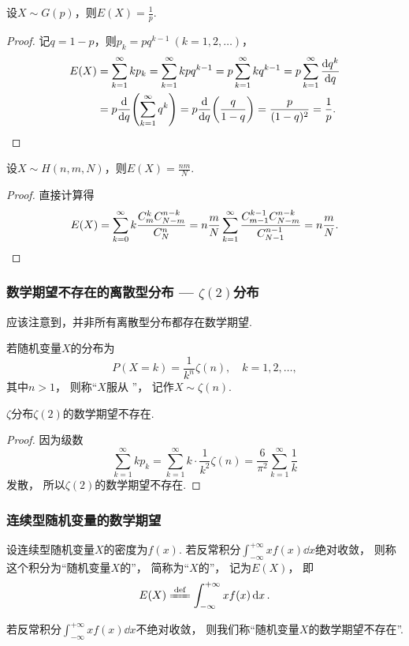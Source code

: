 \begin{proposition}\label{theorem:随机变量的数字特征.几何分布的数学期望}
设\(X \sim G(p)\)，则\(E(X) = \frac{1}{p}\).
\begin{proof}
记\(q = 1-p\)，则\(p_k = pq^{k-1}\ (k=1,2,\dotsc)\)，
\begin{align*}
	E(X)
	&= \sum_{k=1}^\infty k p_k
	= \sum_{k=1}^\infty k p q^{k-1}
	= p \sum_{k=1}^\infty k q^{k-1}
	= p \sum_{k=1}^\infty \dv{q^k}{q} \\
	&= p \dv{q}(\sum_{k=1}^\infty q^k)
	= p \dv{q}(\frac{q}{1-q})
	= \frac{p}{(1-q)^2}
	= \frac{1}{p}.
	\qedhere
\end{align*}
\end{proof}
\end{proposition}

\begin{proposition}
设\(X \sim H(n,m,N)\)，则\(E(X) = \frac{n m}{N}\).
\begin{proof}
直接计算得\[
	E(X)
	= \sum_{k=0}^\infty
		k \frac{C_m^k C_{N-m}^{n-k}}{C_N^n}
	= n \frac{m}{N}
		\sum_{k=1}^\infty
			\frac{C_{m-1}^{k-1} C_{N-m}^{n-k}}{C_{N-1}^{n-1}}
	= n \frac{m}{N}.
	\qedhere
\]
\end{proof}
\end{proposition}

\subsubsection{数学期望不存在的离散型分布 --- \texorpdfstring{\(\zeta(2)\)}{\textzeta(2)}分布}
应该注意到，并非所有离散型分布都存在数学期望.

\begin{definition}
若随机变量\(X\)的分布为\[
	P(X=k) = \frac{1}{k^n} \zeta(n),
	\quad k=1,2,\dotsc,
\]
其中\(n>1\)，
则称“\(X\)服从 ”，
记作\(X \sim \zeta(n)\).
\end{definition}

\begin{proposition}
\(\zeta\)分布\(\zeta(2)\)的数学期望不存在.
\begin{proof}
因为级数\[
	\sum_{k=1}^\infty k p_k
	= \sum_{k=1}^\infty k \cdot \frac{1}{k^2} \zeta(n)
	= \frac{6}{\pi^2} \sum_{k=1}^\infty \frac1k
\]发散，
所以\(\zeta(2)\)的数学期望不存在.
\end{proof}
\end{proposition}

\subsubsection{连续型随机变量的数学期望}
\begin{definition}
设连续型随机变量\(X\)的密度为\(f(x)\).
若反常积分\(\int_{-\infty}^{+\infty} x f(x) \dd{x}\)绝对收敛，
则称这个积分为“随机变量\(X\)的”，
简称为“\(X\)的”，
记为\(E(X)\)，
即\begin{equation}
	E(X) \defeq \int_{-\infty}^{+\infty} x f(x) \dd{x}.
\end{equation}

若反常积分\(\int_{-\infty}^{+\infty} x f(x) \dd{x}\)不绝对收敛，
则我们称“随机变量\(X\)的数学期望不存在”.
\end{definition}

